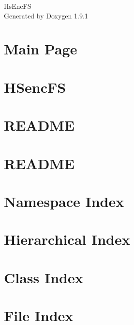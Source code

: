 \let\mypdfximage\pdfximage\def\pdfximage{\immediate\mypdfximage}\documentclass[twoside]{book}
\newcommand{\+}{\discretionary{\mbox{\scriptsize$\hookleftarrow$}}{}{}}
\newcommand{\clearemptydoublepage}{%
  \newpage{\pagestyle{empty}\cleardoublepage}%
}
\begin{document}
\raggedbottom

\hypersetup{pageanchor=false,
             bookmarksnumbered=true,
             pdfencoding=unicode
            }
\begin{titlepage}
\vspace*{7cm}
\begin{center}%
{\Large Hs\+Enc\+FS }\\
\vspace*{1cm}
{\large Generated by Doxygen 1.9.1}\\
\end{center}
\end{titlepage}
\clearemptydoublepage
{}
\tableofcontents
\clearemptydoublepage
{}
\hypersetup{pageanchor=true}

\chapter{Main Page}
\label{index}\hypertarget{index}{}
\chapter{HSenc\+FS}
\label{md_README}

\chapter{README}
\label{md_src_test_data_README}

\chapter{README}
\label{md_src_tests_README}

\chapter{Namespace Index}

\chapter{Hierarchical Index}

\chapter{Class Index}

\chapter{File Index}

\end{document}
